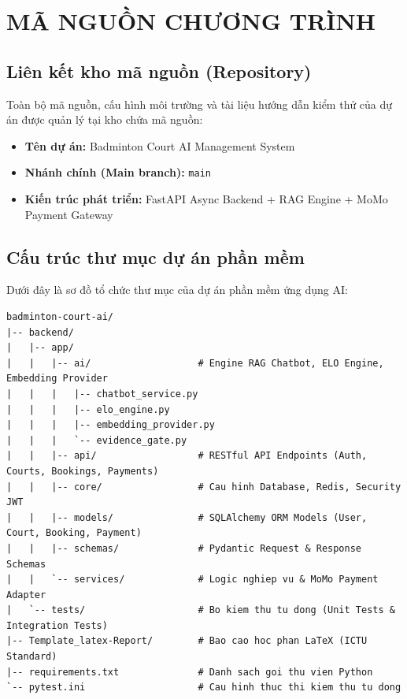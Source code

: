 
\chapter{MÃ NGUỒN CHƯƠNG TRÌNH}
\label{app:sourcecode}

\section{Liên kết kho mã nguồn (Repository)}

Toàn bộ mã nguồn, cấu hình môi trường và tài liệu hướng dẫn kiểm thử của dự án được quản lý tại kho chứa mã nguồn:
\begin{itemize}[leftmargin=1.5cm]
    \item \textbf{Tên dự án:} Badminton Court AI Management System
    \item \textbf{Nhánh chính (Main branch):} \texttt{main}
    \item \textbf{Kiến trúc phát triển:} FastAPI Async Backend + RAG Engine + MoMo Payment Gateway
\end{itemize}

\section{Cấu trúc thư mục dự án phần mềm}
 
Dưới đây là sơ đồ tổ chức thư mục của dự án phần mềm ứng dụng AI:
\begin{lstlisting}[language={}, caption={Cấu trúc cây thư mục mã nguồn hệ thống sân cầu lông AI}, label={lst:tree}]
badminton-court-ai/
|-- backend/
|   |-- app/
|   |   |-- ai/                   # Engine RAG Chatbot, ELO Engine, Embedding Provider
|   |   |   |-- chatbot_service.py
|   |   |   |-- elo_engine.py
|   |   |   |-- embedding_provider.py
|   |   |   `-- evidence_gate.py
|   |   |-- api/                  # RESTful API Endpoints (Auth, Courts, Bookings, Payments)
|   |   |-- core/                 # Cau hinh Database, Redis, Security JWT
|   |   |-- models/               # SQLAlchemy ORM Models (User, Court, Booking, Payment)
|   |   |-- schemas/              # Pydantic Request & Response Schemas
|   |   `-- services/             # Logic nghiep vu & MoMo Payment Adapter
|   `-- tests/                    # Bo kiem thu tu dong (Unit Tests & Integration Tests)
|-- Template_latex-Report/        # Bao cao hoc phan LaTeX (ICTU Standard)
|-- requirements.txt              # Danh sach goi thu vien Python
`-- pytest.ini                    # Cau hinh thuc thi kiem thu tu dong
\end{lstlisting}
